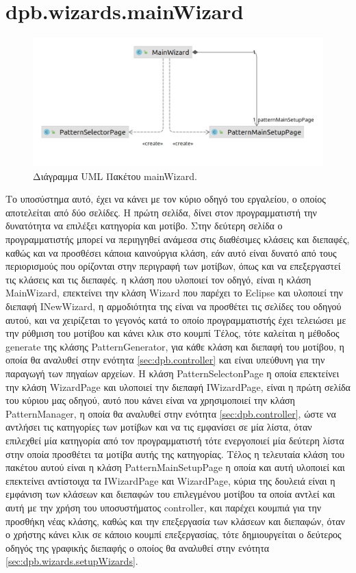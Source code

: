 
\section{dpb.wizards.mainWizard}
\label{sec:dpb.wizards.mainWizard}
\begin{figure}[H]
    \centering
    \includegraphics[width=1.0\textwidth]{Figures/mainWizard.png}
    \caption{Διάγραμμα UML Πακέτου mainWizard.}
    \label{fig:mainWizardUML}
\end{figure}
Το υποσύστημα αυτό, έχει να κάνει με τον κύριο οδηγό του εργαλείου, ο οποίος αποτελείται από δύο σελίδες. Η πρώτη σελίδα, 
δίνει στον προγραμματιστή την δυνατότητα να επιλέξει κατηγορία και μοτίβο. Στην δεύτερη σελίδα ο προγραμματιστής μπορεί να περιηγηθεί 
ανάμεσα στις διαθέσιμες κλάσεις και διεπαφές, καθώς και να προσθέσει κάποια καινούργια κλάση, 
εάν αυτό είναι δυνατό από τους περιορισμούς που ορίζονται στην περιγραφή των μοτίβων, 
όπως και να επεξεργαστεί τις κλάσεις και τις διεπαφές. η κλάση που υλοποιεί τον οδηγό, είναι η κλάση MainWizard, επεκτείνει την κλάση Wizard που παρέχει 
το Eclipse και υλοποιεί την διεπαφή INewWizard, η αρμοδιότητα της είναι να προσθέτει τις σελίδες του οδηγού αυτού, και να χειρίζεται 
το γεγονός κατά το οποίο προγραμματιστής έχει τελειώσει με την ρύθμιση του μοτίβου και κάνει κλικ στο κουμπί Τέλος, τότε καλείται η μέθοδος generate της κλάσης PatternGenerator,
για κάθε κλάση και διεπαφή του μοτίβου, η οποία θα αναλυθεί στην ενότητα \ref{sec:dpb.controller} και είναι υπεύθυνη για την παραγωγή των πηγαίων αρχείων.
Η κλάση PatternSelectonPage η οποία επεκτείνει την κλάση WizardPage και υλοποιεί την διεπαφή IWizardPage, 
είναι η πρώτη σελίδα του κύριου μας οδηγού, αυτό που κάνει είναι να χρησιμοποιεί την κλάση PatternManager, η οποία 
θα αναλυθεί στην ενότητα \ref{sec:dpb.controller}, ώστε να αντλήσει τις κατηγορίες των μοτίβων και να τις εμφανίσει σε μία λίστα, 
όταν επιλεχθεί μία κατηγορία από τον προγραμματιστή τότε ενεργοποιεί μία δεύτερη λίστα στην οποία προσθέτει 
τα μοτίβα αυτής της κατηγορίας. Τέλος η τελευταία κλάση του πακέτου αυτού είναι η κλάση PatternMainSetupPage 
η οποία και αυτή υλοποιεί και επεκτείνει αντίστοιχα τα IWizardPage και WizardPage, κύρια της δουλειά είναι η εμφάνιση των κλάσεων και διεπαφών 
του επιλεγμένου μοτίβου τα οποία αντλεί και αυτή με την χρήση του υποσυστήματος controller, και παρέχει κουμπιά για την προσθήκη νέας κλάσης, καθώς και 
την επεξεργασία των κλάσεων και διεπαφών, όταν ο χρήστης κάνει κλικ σε κάποιο κουμπί επεξεργασίας, τότε δημιουργείται 
ο δεύτερος οδηγός της γραφικής διεπαφής ο οποίος θα αναλυθεί στην ενότητα \ref{sec:dpb.wizards.setupWizards}.\newpage
